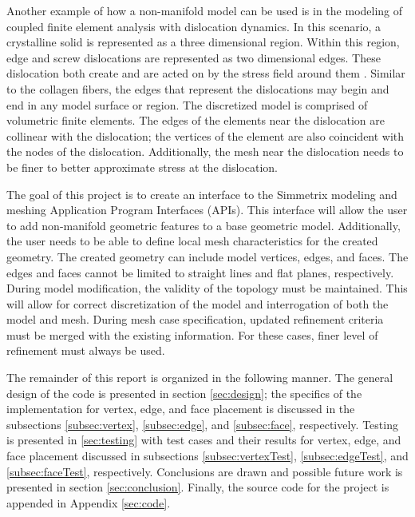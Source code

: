 \documentclass[a4paper, 12pt]{article}
\begin{document}
Another example of how a non-manifold model can be used is in the 
modeling of coupled finite element analysis with dislocation dynamics. 
In this scenario, a crystalline solid is represented as a three dimensional 
region. Within this region, edge and screw dislocations are represented
as two dimensional edges. These dislocation both create and are acted on
by the stress field around them \cite{askeland}. Similar to the collagen 
fibers, the edges that represent the dislocations may begin and end in
any model surface or region. The discretized model is comprised of 
volumetric finite elements. The edges of the elements near the dislocation 
are collinear with the dislocation; the vertices of the element are also
coincident with the nodes of the dislocation. Additionally, the mesh near
the dislocation needs to be finer to better approximate stress at the
dislocation.

The goal of this project is to create an interface to the Simmetrix 
modeling and meshing Application Program Interfaces (APIs). This 
interface will allow the user to add non-manifold geometric features
to a base geometric model. Additionally, the user needs to be able
to define local mesh characteristics for the created geometry. 
The created geometry can include model vertices, edges, and faces.
The edges and faces cannot be limited to straight lines and flat 
planes, respectively. During model modification, the validity of 
the topology must be maintained. This will allow for correct 
discretization of the model and interrogation of both the model and mesh.
During mesh case specification, updated refinement criteria must be merged 
with the existing information. For these cases,
finer level of refinement must always be used. 

The remainder of this report is organized in the following manner.
The general design of the code is presented in 
section \ref{sec:design}; 
the specifics of the implementation for vertex, edge, and face placement
is discussed in the subsections \ref{subsec:vertex},
\ref{subsec:edge}, and \ref{subsec:face}, respectively.
Testing is presented in \ref{sec:testing} with test cases and their results
for vertex, edge, and face placement discussed in subsections
\ref{subsec:vertexTest}, \ref{subsec:edgeTest}, and \ref{subsec:faceTest}, 
respectively. 
Conclusions are drawn and possible future work is presented in 
section \ref{sec:conclusion}. 
Finally, the source code for the project is appended in
Appendix \ref{sec:code}.
\end{document}
